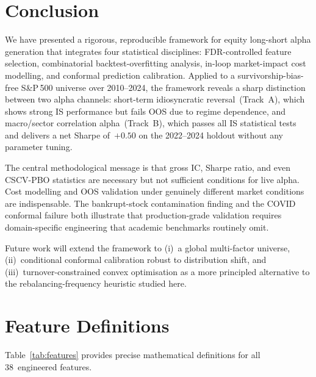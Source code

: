 \documentclass[journal]{IEEEtran}
\begin{document}
\section{Conclusion}
\label{sec:conclusion}

We have presented a rigorous, reproducible framework for equity
long-short alpha generation that integrates four statistical
disciplines: FDR-controlled feature selection, combinatorial
backtest-overfitting analysis, in-loop market-impact cost modelling,
and conformal prediction calibration.
Applied to a survivorship-bias-free S\&P\,500 universe over 2010--2024,
the framework reveals a sharp distinction between two alpha channels:
short-term idiosyncratic reversal~(Track~A), which shows strong IS
performance but fails OOS due to regime dependence, and macro/sector
correlation alpha~(Track~B), which passes all IS statistical tests
and delivers a net Sharpe of~$+0.50$ on the 2022--2024 holdout
without any parameter tuning.

The central methodological message is that gross IC, Sharpe ratio,
and even CSCV-PBO statistics are necessary but not sufficient
conditions for live alpha.
Cost modelling and OOS validation under genuinely different market
conditions are indispensable.
The bankrupt-stock contamination finding and the COVID conformal
failure both illustrate that production-grade validation requires
domain-specific engineering that academic benchmarks routinely omit.

Future work will extend the framework to (i)~a global multi-factor
universe, (ii)~conditional conformal calibration robust to
distribution shift, and (iii)~turnover-constrained convex
optimisation as a more principled alternative to the
rebalancing-frequency heuristic studied here.

\appendices

\section{Feature Definitions}
\label{app:features}
Table~\ref{tab:features} provides precise mathematical definitions
for all 38~engineered features.
\end{document}
